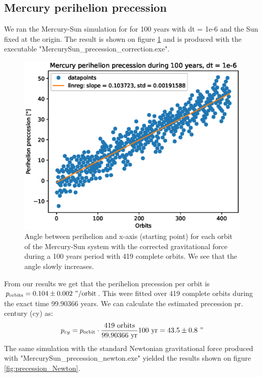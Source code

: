 \documentclass[american,a4paper,12pt]{article}
\begin{document}
\subsection{Mercury perihelion precession}
We ran the Mercury-Sun simulation for for 100 years with dt = 1e-6 and the Sun fixed at the origin. The result is shown on figure \ref{fig:preccession_GR} and is produced with the executable "MercurySun\_precession\_correction.exe".
\begin{figure}[H]
    \centering
    \includegraphics[width = \textwidth]{figures/Mercury_precession.eps}
    \caption{Angle between perihelion and x-axis (starting point) for each orbit of the Mercury-Sun system with the corrected gravitational force during a 100 years period with 419 complete orbits. We see that the angle slowly increases.}
    \label{fig:preccession_GR}
\end{figure}
From our results we get that the perihelion precession per orbit is $p_{\text{orbits}} = 0.104 \pm 0.002 \ "/\text{orbit}$. This were fitted over 419 complete orbits during the exact time 99.90366 years. We can calculate the estimated precession pr. century (cy) as:
\begin{align*}
    p_{cy} = p_{\text{orbit}} \cdot \frac{419 \ \text{orbits}}{99.90366 \ \text{yr}}100 \ \text{yr} = 43.5 \pm 0.8 \ "
\end{align*}
The same simulation with the standard Newtonian gravitational force produced with "MercurySun\_precession\_newton.exe" yielded the results shown on figure \ref{fig:precession_Newton}.
\end{document}
